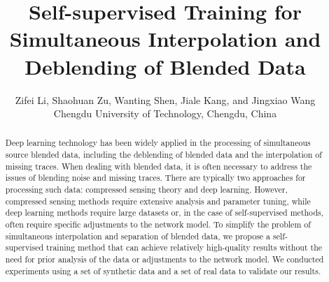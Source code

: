 \documentclass{segabs}
\begin{document}
\title{Self-supervised Training for Simultaneous Interpolation and Deblending of Blended Data}

\renewcommand{\thefootnote}{\fnsymbol{footnote}} 

\author{
Zifei Li\footnotemark[2]\footnotemark[1],
Shaohuan Zu\footnotemark[2], 
Wanting Shen\footnotemark[2],
Jiale Kang\footnotemark[2],
and
Jingxiao Wang\footnotemark[2]
\\
\footnotemark[2]Chengdu University of Technology, Chengdu, China
}


\maketitle

\begin{abstract}
Deep learning technology has been widely applied in the processing of simultaneous source blended data, including the deblending of blended data and the interpolation of missing traces. When dealing with blended data, it is often necessary to address the issues of blending noise and missing traces. There are typically two approaches for processing such data: compressed sensing theory and deep learning. However, compressed sensing methods require extensive analysis and parameter tuning, while deep learning methods require large datasets or, in the case of self-supervised methods, often require specific adjustments to the network model. To simplify the problem of simultaneous interpolation and separation of blended data, we propose a self-supervised training method that can achieve relatively high-quality results without the need for prior analysis of the data or adjustments to the network model. We conducted experiments using a set of synthetic data and a set of real data to validate our results.%

\end{abstract}
\end{document}
